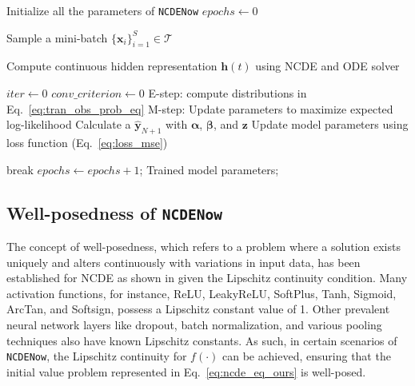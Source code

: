 \documentclass[sigconf]{acmart}
\begin{document}
\begin{algorithm}[t]
    \small
    \SetAlgoLined
    \caption{Training procedure for \texttt{NCDENow}}
    \label{alg:train}
    \begin{algorithmic}[1]
    \raggedright
    \STATE Initialize all the parameters of \texttt{NCDENow}
    \STATE $epochs \gets 0$

        \STATE Sample a mini-batch $\{\mathbf{x}_i\}_{i=1}^{S} \in \mathcal{T}$\label{a:mini}
    
        \STATE Compute continuous hidden representation $\mathbf{h}(t)$ using NCDE and ODE solver\label{a:cont}

        \STATE $iter \gets 0$
        \STATE $conv\_criterion \gets 0$
        \STATE E-step: compute distributions in Eq.~\eqref{eq:tran_obs_prob_eq}
        \STATE M-step: Update parameters to maximize expected log-likelihood
    \ENDWHILE
        \STATE Calculate a $\hat{\mathbf{y}}_{N+1}$ with $\mathbf{\alpha}$, $\mathbf{\bm{\beta}}$, and $\mathbf{z}$
        \STATE Update model parameters using loss function (Eq.~\eqref{eq:loss_mse})
        
        \STATE break
        \ENDIF
        \STATE $epochs \gets epochs + 1$;
    \ENDWHILE
    \STATE \Return Trained model parameters;
\end{algorithmic}
\end{algorithm}

\subsection{Well-posedness of \texttt{NCDENow}}
The concept of well-posedness, which refers to a problem where a solution exists uniquely and alters continuously with variations in input data, has been established for NCDE as shown in \citet[Theorem 1.3]{lyons2004differential} given the Lipschitz continuity condition. Many activation functions, for instance, ReLU, LeakyReLU, SoftPlus, Tanh, Sigmoid, ArcTan, and Softsign, possess a Lipschitz constant value of 1. Other prevalent neural network layers like dropout, batch normalization, and various pooling techniques also have known Lipschitz constants. As such, in certain scenarios of \texttt{NCDENow}, the Lipschitz continuity for $f(\cdot)$ can be achieved, ensuring that the initial value problem represented in Eq.~\eqref{eq:ncde_eq_ours} is well-posed.
\end{document}

